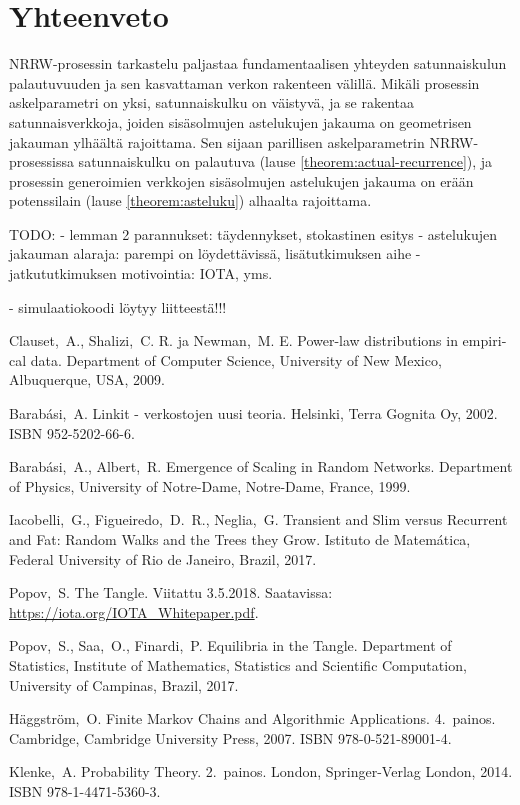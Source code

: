 \documentclass[finnish, 12pt, a4paper, sci, utf8, pdfa]{aaltothesis}
\begin{document}
\section{Yhteenveto}

NRRW-prosessin tarkastelu paljastaa fundamentaalisen yhteyden satunnaiskulun palautuvuuden ja sen kasvattaman verkon rakenteen välillä. Mikäli prosessin askelparametri on yksi,
satunnaiskulku on väistyvä, ja se rakentaa satunnaisverkkoja, joiden sisäsolmujen astelukujen jakauma on geometrisen jakauman ylhäältä rajoittama. Sen sijaan parillisen askelparametrin
NRRW-prosessissa satunnaiskulku on palautuva (lause \ref{theorem:actual-recurrence}), ja prosessin generoimien verkkojen sisäsolmujen astelukujen jakauma on erään potenssilain 
(lause \ref{theorem:asteluku}) alhaalta rajoittama. 

TODO:
- lemman 2 parannukset: täydennykset, stokastinen esitys
- astelukujen jakauman alaraja: parempi on löydettävissä, lisätutkimuksen aihe
- jatkututkimuksen motivointia: IOTA, yms.

- simulaatiokoodi löytyy liitteestä!!!

\clearpage

\thesisbibliography

\begin{thebibliography}{99}

 Clauset,\ A., Shalizi,\ C. R. ja Newman,\ M. E. 
   \foreignlanguage{english}{Power-law distributions in empirical data.} 
   Department of Computer Science, University of New Mexico, Albuquerque, USA, 2009.

 Barabási,\ A. Linkit - verkostojen uusi teoria. 
   Helsinki, Terra Gognita Oy, 2002. ISBN 952-5202-66-6. 

 Barabási,\ A., Albert,\ R.
   \foreignlanguage{english}{Emergence of Scaling in Random Networks.} 
   Department of Physics, University of Notre-Dame, Notre-Dame, France, 1999.

 Iacobelli,\ G., Figueiredo,\ D.\ R., Neglia,\ G. 
   \foreignlanguage{english}{Transient and Slim versus Recurrent and Fat: Random Walks and the Trees they Grow.} 
   Istituto de Matemática, Federal University of Rio de Janeiro, Brazil, 2017.

 Popov,\ S. The Tangle. Viitattu 3.5.2018. Saatavissa: \url{https://iota.org/IOTA_Whitepaper.pdf}.

 Popov,\ S., Saa,\ O., Finardi,\ P. 
   \foreignlanguage{english}{Equilibria in the Tangle.} 
   Department of Statistics, Institute of Mathematics, Statistics and Scientific Computation, University of Campinas, Brazil, 2017.

 Häggström,\ O.
   \foreignlanguage{english}{Finite Markov Chains and Algorithmic Applications.} 
   4.\ painos. Cambridge, Cambridge University Press, 2007. ISBN 978-0-521-89001-4.

 Klenke,\ A.
   \foreignlanguage{englisn}{Probability Theory.}
   2.\ painos. London, Springer-Verlag London, 2014. ISBN 978-1-4471-5360-3.

\end{thebibliography}
\end{document}
